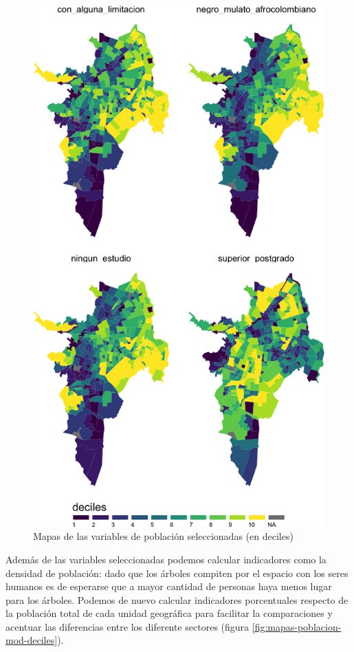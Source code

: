 \documentclass[12pt,]{book}
\begin{document}
\begin{figure}
\includegraphics[width=1\linewidth]{tesis-unigis_files/figure-latex/mapas-poblacion-deciles-1} \caption{Mapas de las variables de población seleccionadas (en deciles)}\label{fig:mapas-poblacion-deciles}
\end{figure}

Además de las variables seleccionadas podemos calcular indicadores como
la densidad de población: dado que los árboles compiten por el espacio
con los seres humanos es de esperarse que a mayor cantidad de personas
haya menos lugar para los árboles. Podemos de nuevo calcular indicadores
porcentuales respecto de la población total de cada unidad geográfica
para facilitar la comparaciones y acentuar las diferencias entre los
diferente sectores (figura \ref{fig:mapas-poblacion-mod-deciles}).
\end{document}
